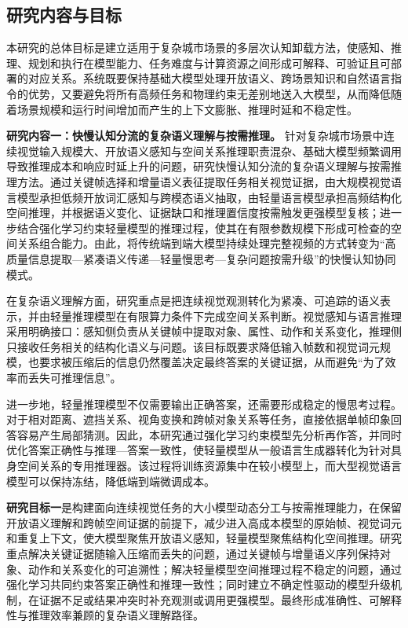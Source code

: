 \subsection{研究内容与目标}
本研究的总体目标是建立适用于复杂城市场景的多层次认知卸载方法，使感知、推理、规划和执行在模型能力、任务难度与计算资源之间形成可解释、可验证且可部署的对应关系。系统既要保持基础大模型处理开放语义、跨场景知识和自然语言指令的优势，又要避免将所有高频任务和物理约束无差别地送入大模型，从而降低随着场景规模和运行时间增加而产生的上下文膨胀、推理时延和不稳定性。

\textbf{研究内容一：快慢认知分流的复杂语义理解与按需推理。} 针对复杂城市场景中连续视觉输入规模大、开放语义感知与空间关系推理职责混杂、基础大模型频繁调用导致推理成本和响应时延上升的问题，研究快慢认知分流的复杂语义理解与按需推理方法。通过关键帧选择和增量语义表征提取任务相关视觉证据，由大规模视觉语言模型承担低频开放词汇感知与跨模态语义抽取，由轻量语言模型承担高频结构化空间推理，并根据语义变化、证据缺口和推理置信度按需触发更强模型复核；进一步结合强化学习约束轻量模型的推理过程，使其在有限参数规模下形成可检查的空间关系组合能力。由此，将传统端到端大模型持续处理完整视频的方式转变为“高质量信息提取—紧凑语义传递—轻量慢思考—复杂问题按需升级”的快慢认知协同模式。

在复杂语义理解方面，研究重点是把连续视觉观测转化为紧凑、可追踪的语义表示，并由轻量推理模型在有限算力条件下完成空间关系判断。视觉感知与语言推理采用明确接口：感知侧负责从关键帧中提取对象、属性、动作和关系变化，推理侧只接收任务相关的结构化语义与问题。该目标既要求降低输入帧数和视觉词元规模，也要求被压缩后的信息仍然覆盖决定最终答案的关键证据，从而避免“为了效率而丢失可推理信息”。

进一步地，轻量推理模型不仅需要输出正确答案，还需要形成稳定的慢思考过程。对于相对距离、遮挡关系、视角变换和跨帧对象关系等任务，直接依据单帧印象回答容易产生局部猜测。因此，本研究通过强化学习约束模型先分析再作答，并同时优化答案正确性与推理—答案一致性，使轻量模型从一般语言生成器转化为针对具身空间关系的专用推理器。该过程将训练资源集中在较小模型上，而大型视觉语言模型可以保持冻结，降低端到端微调成本。

\textbf{研究目标一}是构建面向连续视觉任务的大小模型动态分工与按需推理能力，在保留开放语义理解和跨帧空间证据的前提下，减少进入高成本模型的原始帧、视觉词元和重复上下文，使大模型聚焦开放语义感知，轻量模型聚焦结构化空间推理。研究重点解决关键证据随输入压缩而丢失的问题，通过关键帧与增量语义序列保持对象、动作和关系变化的可追溯性；解决轻量模型空间推理过程不稳定的问题，通过强化学习共同约束答案正确性和推理一致性；同时建立不确定性驱动的模型升级机制，在证据不足或结果冲突时补充观测或调用更强模型。最终形成准确性、可解释性与推理效率兼顾的复杂语义理解路径。


